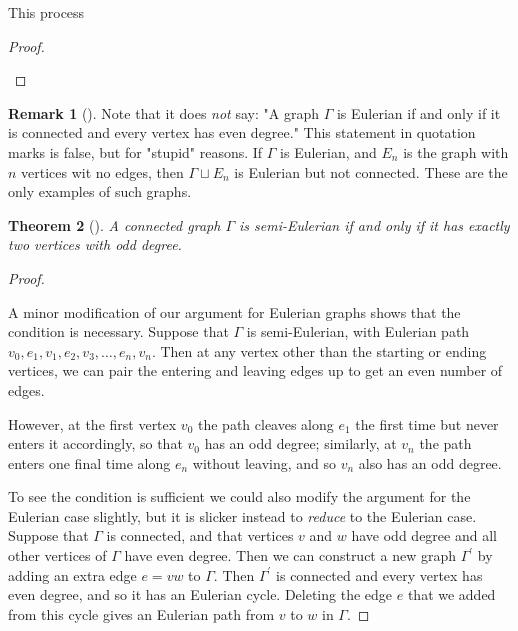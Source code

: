 \documentclass[10pt,]{book}
\theoremstyle{plain}
\newtheorem{theorem}{Theorem}[section]
\theoremstyle{definition}
\theoremstyle{definition}
\newtheorem{remark}[theorem]{Remark}
\theoremstyle{definition}
\theoremstyle{definition}
\numberwithin{equation}{section}
\begin{document}
\hypertarget{p-137}{}%
This process%
\begin{proof}\hypertarget{proof-4}{}
\end{proof}
\begin{remark}[]\label{remark-1}
\hypertarget{p-138}{}%
Note that it does \emph{not} say: "A graph \(\Gamma\) is Eulerian if and only if it is connected and every vertex has even degree." This statement in quotation marks is false, but for "stupid" reasons.  If \(\Gamma\) is Eulerian, and \(E_n\) is the graph with \(n\) vertices wit no edges, then \(\Gamma\sqcup E_n\) is Eulerian but not connected.  These are the only examples of such graphs.%
\end{remark}
\begin{theorem}[{}]\label{theorem-3}
\hypertarget{p-139}{}%
A connected graph \(\Gamma\) is semi-Eulerian if and only if it has exactly two vertices with odd degree.%
\end{theorem}
\begin{proof}\hypertarget{proof-5}{}
\hypertarget{p-140}{}%
A minor modification of our argument for Eulerian graphs shows that the condition is necessary.  Suppose that \(\Gamma\) is semi-Eulerian, with Eulerian path \(v_0, e_1, v_1,e_2,v_3,\dots,e_n,v_n\).  Then at any vertex other than the starting or ending vertices, we can pair the entering and leaving edges up to get an even number of edges.%
\par
\hypertarget{p-141}{}%
However, at the first vertex \(v_0\) the path cleaves along \(e_1\) the first time but never enters it accordingly, so that \(v_0\) has an odd degree; similarly, at \(v_n\) the path enters one final time along \(e_n\) without leaving, and so \(v_n\) also has an odd degree.%
\par
\hypertarget{p-142}{}%
To see the condition is sufficient we could also modify the argument for the Eulerian case slightly, but it is slicker instead to \emph{reduce} to the Eulerian case.  Suppose that \(\Gamma\) is connected, and that vertices \(v\) and \(w\) have odd degree and all other vertices of \(\Gamma\) have even degree.  Then we can construct a new graph \(\Gamma^\prime\) by adding an extra edge \(e=vw\) to \(\Gamma\).  Then \(\Gamma^\prime\) is connected and every vertex has even degree, and so it has an Eulerian cycle.  Deleting the edge \(e\) that we added from this cycle gives an Eulerian path from \(v\) to \(w\) in \(\Gamma\).%
\end{proof}
\typeout{************************************************}
\typeout{************************************************}
\end{document}
